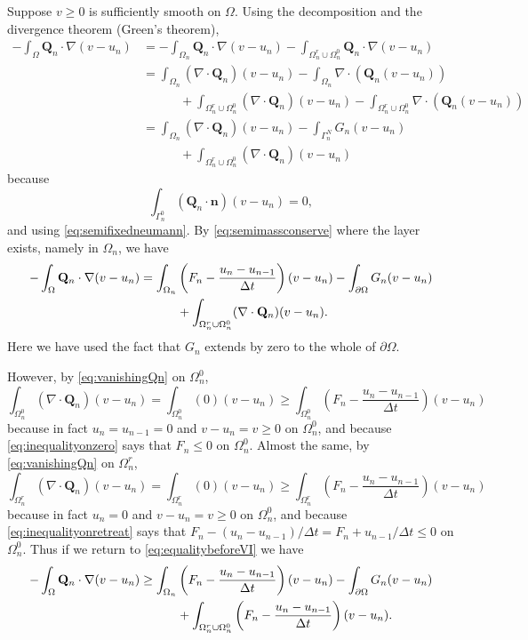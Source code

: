 \documentclass[final,leqno,onefignum,onetabnum]{siamltex1213bueler}
\newcommand\bn{\mathbf{n}}
\newcommand\bQ{\mathbf{Q}}
\newcommand{\Div}{\nabla\cdot}
\renewcommand{\grad}{\nabla}
\begin{document}
Suppose $v\ge 0$ is sufficiently smooth on $\Omega$.  Using the decomposition and the divergence theorem (Green's theorem),
\begin{align*}
-\int_{\Omega} \bQ_n \cdot \grad(v-u_n) &= -\int_{\Omega_n} \bQ_n \cdot \grad(v-u_n) - \int_{\Omega_n^r \cup \Omega_n^0} \bQ_n \cdot \grad(v-u_n) \\
  &= \int_{\Omega_n} (\Div \bQ_n) (v-u_n) - \int_{\Omega_n} \Div \left(\bQ_n (v-u_n)\right) \\
  &\qquad\quad + \int_{\Omega_n^r \cup \Omega_n^0} (\Div \bQ_n) (v-u_n) - \int_{\Omega_n^r \cup \Omega_n^0} \Div \left(\bQ_n (v-u_n)\right) \\
  &= \int_{\Omega_n} (\Div \bQ_n) (v-u_n) - \int_{\Gamma_n^N} G_n (v-u_n) \\
  &\qquad\quad + \int_{\Omega_n^r \cup \Omega_n^0} (\Div \bQ_n) (v-u_n)
\end{align*}
because
       $$\int_{\Gamma_n^0} (\bQ_n \cdot \bn) (v-u_n) = 0,$$
and using \eqref{eq:semifixedneumann}.  By \eqref{eq:semimassconserve} where the layer exists, namely in $\Omega_n$, we have
\begin{align}
-\int_{\Omega} \bQ_n \cdot \grad(v-u_n) &= \int_{\Omega_n} \left(F_n - \frac{u_n - u_{n-1}}{\Delta t}\right) (v-u_n) - \int_{\partial \Omega} G_n (v-u_n) \label{eq:equalitybeforeVI} \\
  &\qquad\quad + \int_{\Omega_n^r \cup \Omega_n^0} (\Div \bQ_n) (v-u_n). \notag
\end{align}
Here we have used the fact that $G_n$ extends by zero to the whole of $\partial \Omega$.

However, by \eqref{eq:vanishingQn} on $\Omega_n^0$,
    $$\int_{\Omega_n^0} (\Div \bQ_n) (v-u_n) = \int_{\Omega_n^0} (0) (v-u_n) \ge \int_{\Omega_n^0} \left(F_n - \frac{u_n - u_{n-1}}{\Delta t}\right) (v-u_n)$$
because in fact $u_n=u_{n-1}=0$ and $v-u_n = v \ge 0$ on $\Omega_n^0$, and because \eqref{eq:inequalityonzero} says that $F_n \le 0$ on $\Omega_n^0$.  Almost the same, by \eqref{eq:vanishingQn} on $\Omega_n^r$,
    $$\int_{\Omega_n^r} (\Div \bQ_n) (v-u_n) = \int_{\Omega_n^r} (0) (v-u_n) \ge \int_{\Omega_n^r} \left(F_n - \frac{u_n - u_{n-1}}{\Delta t}\right) (v-u_n)$$
because in fact $u_n=0$ and $v-u_n = v \ge 0$ on $\Omega_n^0$, and because \eqref{eq:inequalityonretreat} says that $F_n - (u_n - u_{n-1})/\Delta t = F_n + u_{n-1}/\Delta t \le 0$ on $\Omega_n^0$.  Thus if we return to \eqref{eq:equalitybeforeVI} we have
\begin{align}
-\int_{\Omega} \bQ_n \cdot \grad(v-u_n) &\ge \int_{\Omega_n} \left(F_n - \frac{u_n - u_{n-1}}{\Delta t}\right) (v-u_n) - \int_{\partial \Omega} G_n (v-u_n) \label{eq:essentiallyVI} \\
  &\qquad\quad + \int_{\Omega_n^r \cup \Omega_n^0} \left(F_n - \frac{u_n - u_{n-1}}{\Delta t}\right) (v-u_n). \notag
\end{align}
\end{document}
